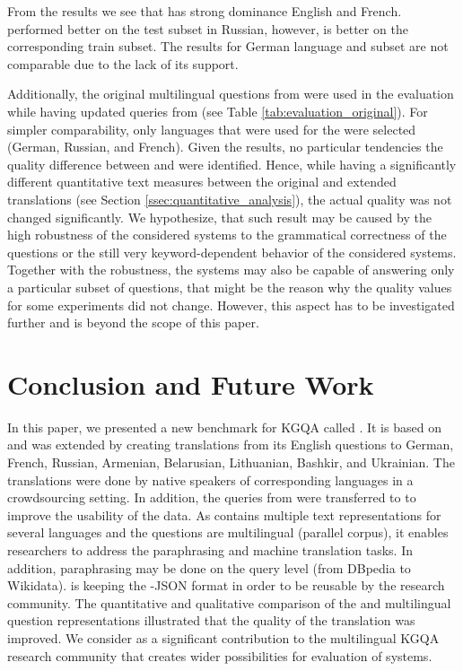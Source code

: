 \documentclass[conference]{IEEEtran}
\begin{document}
From the results we see that \QAnswer has strong dominance \wrt English and French.
\DeepPavlov performed better on the \Wikidata test subset in Russian, however, \QAnswer is better on the corresponding train subset.
The results for German language and \DBpedia subset are not comparable due to the lack of its support.

Additionally, the original multilingual questions from  were used in the evaluation while having updated \SPARQL queries from \QALDplus (see Table \ref{tab:evaluation_original}).
For simpler comparability, only languages that were used for the \QALDplus were selected (\ie German, Russian, and French).
Given the results, no particular tendencies \wrt the quality difference between  and \QALDplus were identified.
Hence, while having a significantly different quantitative text measures between the original and extended translations (see Section \ref{ssec:quantitative_analysis}), the actual \QA quality was not changed significantly.
We hypothesize, that such result may be caused by the high robustness of the considered \KGQA systems to the grammatical correctness of the questions or the still very keyword-dependent behavior of the considered \KGQA systems.
Together with the robustness, the systems may also be capable of answering only a particular subset of questions, that might be the reason why the quality values for some experiments did not change.
However, this aspect has to be investigated further and is beyond the scope of this paper.

\section{Conclusion and Future Work}\label{sec:conclusion}


In this paper, we presented a new benchmark for KGQA called \QALDplus.
It is based on  and was extended by creating translations from its English questions to German, French, Russian, Armenian, Belarusian, Lithuanian, Bashkir, and Ukrainian.
The translations were done by native speakers of corresponding languages in a crowdsourcing setting.
In addition, the \DBpedia \SPARQL queries from  were transferred to \Wikidata to improve the usability of the data.
As \QALDplus contains multiple text representations for several languages and the questions are multilingual (\ie parallel corpus), it enables researchers to address the paraphrasing and machine translation tasks.
In addition, paraphrasing may be done on the \SPARQL query level (\ie from DBpedia to Wikidata).
\QALDplus is keeping the \QALD-JSON format in order to be reusable by the research community.
The quantitative and qualitative comparison of the  and \QALDplus multilingual question representations illustrated that the quality of the translation was improved.
We consider \QALDplus as a significant contribution to the multilingual KGQA research community that creates wider possibilities for evaluation of \KGQA systems.
\end{document}
